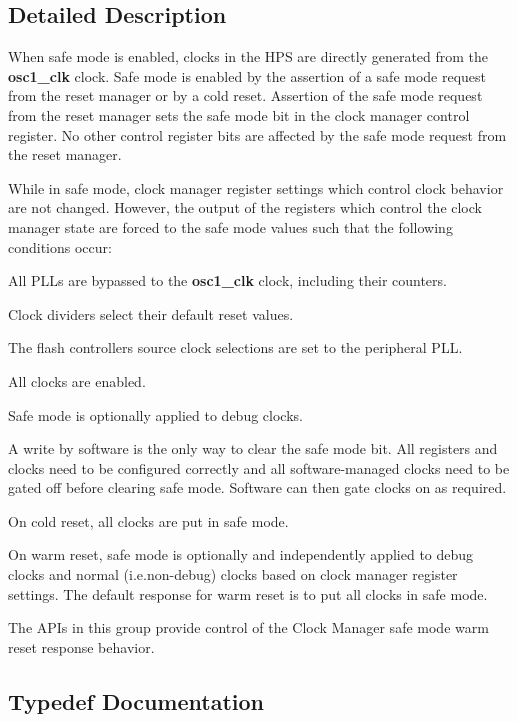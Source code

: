 \subsection{Detailed Description}
When safe mode is enabled, clocks in the H\+PS are directly generated from the {\bfseries{osc1\+\_\+clk}} clock. Safe mode is enabled by the assertion of a safe mode request from the reset manager or by a cold reset. Assertion of the safe mode request from the reset manager sets the safe mode bit in the clock manager control register. No other control register bits are affected by the safe mode request from the reset manager.

While in safe mode, clock manager register settings which control clock behavior are not changed. However, the output of the registers which control the clock manager state are forced to the safe mode values such that the following conditions occur\+:
\begin{DoxyItemize}
\item All P\+L\+Ls are bypassed to the {\bfseries{osc1\+\_\+clk}} clock, including their counters.
\item Clock dividers select their default reset values.
\item The flash controllers source clock selections are set to the peripheral P\+LL.
\item All clocks are enabled.
\item Safe mode is optionally applied to debug clocks.
\end{DoxyItemize}

A write by software is the only way to clear the safe mode bit. All registers and clocks need to be configured correctly and all software-\/managed clocks need to be gated off before clearing safe mode. Software can then gate clocks on as required.

On cold reset, all clocks are put in safe mode.

On warm reset, safe mode is optionally and independently applied to debug clocks and normal (i.\+e.\+non-\/debug) clocks based on clock manager register settings. The default response for warm reset is to put all clocks in safe mode.

The A\+P\+Is in this group provide control of the Clock Manager safe mode warm reset response behavior. 

\subsection{Typedef Documentation}
\mbox{\label{group__CLK__MGR__SAFE__MODE_gacf9924b29261719c075137e2805f8d3f}} 
